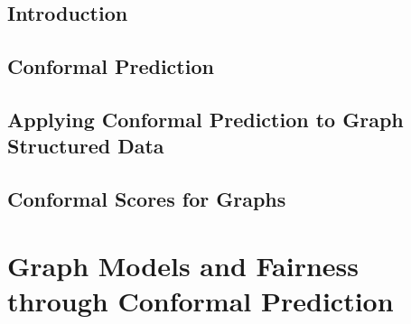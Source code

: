 \subsection{Introduction}


\subsection{Conformal Prediction}


\subsection{Applying Conformal Prediction to Graph Structured Data}


\subsection{Conformal Scores for Graphs}



\section{Graph Models and Fairness through Conformal Prediction}


\begin{subappendices}
    
\end{subappendices}